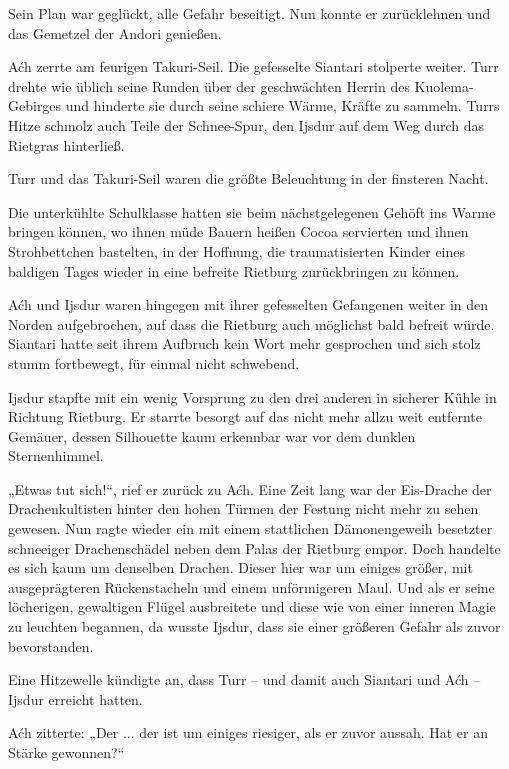 Sein Plan war geglückt, alle Gefahr beseitigt. Nun konnte er zurücklehnen und das Gemetzel der Andori genießen.\bigskip







Aćh zerrte am feurigen Takuri-Seil. Die gefesselte Siantari stolperte weiter. Turr drehte wie üblich seine Runden über der geschwächten Herrin des Kuolema-Gebirges und hinderte sie durch seine schiere Wärme, Kräfte zu sammeln. Turrs Hitze schmolz auch Teile der Schnee-Spur, den Ijsdur auf dem Weg durch das Rietgras hinterließ.

Turr und das Takuri-Seil waren die größte Beleuchtung in der finsteren Nacht.

Die unterkühlte Schulklasse hatten sie beim nächstgelegenen Gehöft ins Warme bringen können, wo ihnen müde Bauern heißen Cocoa servierten und ihnen Strohbettchen bastelten, in der Hoffnung, die traumatisierten Kinder eines baldigen Tages wieder in eine befreite Rietburg zurückbringen zu können.

Aćh und Ijsdur waren hingegen mit ihrer gefesselten Gefangenen weiter in den Norden aufgebrochen, auf dass die Rietburg auch möglichst bald befreit würde. Siantari hatte seit ihrem Aufbruch kein Wort mehr gesprochen und sich stolz stumm fortbewegt, für einmal nicht schwebend.

Ijsdur stapfte mit ein wenig Vorsprung zu den drei anderen in sicherer Kühle in Richtung Rietburg. Er starrte besorgt auf das nicht mehr allzu weit entfernte Gemäuer, dessen Silhouette kaum erkennbar war vor dem dunklen Sternenhimmel.

„Etwas tut sich!“, rief er zurück zu Aćh. Eine Zeit lang war der Eis-Drache der Drachenkultisten hinter den hohen Türmen der Festung nicht mehr zu sehen gewesen. Nun ragte wieder ein mit einem stattlichen Dämonengeweih besetzter schneeiger Drachenschädel neben dem Palas der Rietburg empor. Doch handelte es sich kaum um denselben Drachen. Dieser hier war um einiges größer, mit ausgeprägteren Rückenstacheln und einem unförmigeren Maul. Und als er seine löcherigen, gewaltigen Flügel ausbreitete und diese wie von einer inneren Magie zu leuchten begannen, da wusste Ijsdur, dass sie einer größeren Gefahr als zuvor bevorstanden.

Eine Hitzewelle kündigte an, dass Turr – und damit auch Siantari und Aćh – Ijsdur erreicht hatten.

Aćh zitterte: „Der ... der ist um einiges riesiger, als er zuvor aussah. Hat er an Stärke gewonnen?“

